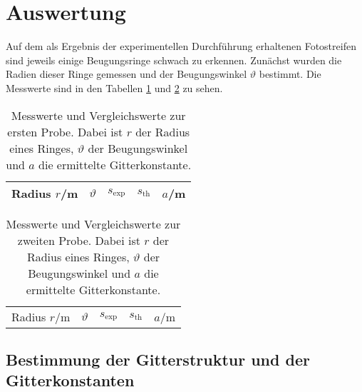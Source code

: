 

\section{Auswertung}
Auf dem als Ergebnis der experimentellen Durchführung erhaltenen Fotostreifen sind 
jeweils einige Beugungsringe schwach zu erkennen. Zunächst wurden die Radien dieser 
Ringe gemessen und der Beugungswinkel $\vartheta$ bestimmt. Die Messwerte sind in den 
Tabellen \ref{tab:1} und \ref{tab:2} zu sehen.

\begin{table}[h]
\centering
\begin{tabular}{ccccc}
Radius $r$/m & $\vartheta$ &$s_\text{exp}$& $s_\text{th}$& $a$/m \\
\midrule

\end{tabular}
\caption{Messwerte und Vergleichswerte zur ersten Probe. Dabei ist $r$ der Radius 
eines Ringes, $\vartheta$ der Beugungswinkel und $a$ die ermittelte Gitterkonstante.}
\label{tab:1}
\end{table}
\begin{table}[h]
\centering
\begin{tabular}{ccccc}
Radius $r$/m & $\vartheta$ &$s_\text{exp}$& $s_\text{th}$& $a$/m \\

\end{tabular}
\caption{Messwerte und Vergleichswerte zur zweiten Probe. Dabei ist $r$ der Radius 
eines Ringes, $\vartheta$ der Beugungswinkel und $a$ die ermittelte Gitterkonstante.}
\label{tab:2}
\end{table}

\subsection{Bestimmung der Gitterstruktur und der Gitterkonstanten}

